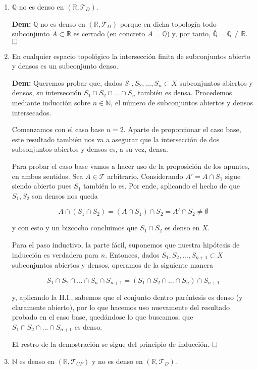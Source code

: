 \documentclass{article}
\begin{document}
\begin{enumerate}[label=(\textit{\roman*})]
    \item $\mathbb{Q}$ no es denso en $(\mathbb{R}, \mathcal{T}_D)$.

    \textbf{Dem:} $\mathbb{Q}$ no es denso en $(\mathbb{R}, \mathcal{T}_D)$ porque en dicha topología todo subconjunto $A \subset \mathbb{R}$ es cerrado (en concreto $A = \mathbb{Q}$) y, por tanto, $\overline{\mathbb{Q}} = \mathbb{Q} \neq \mathbb{R}$. $\hfill\square$

    \item En cualquier espacio topológico la intersección finita de subconjuntos abierto y densos  es un subconjunto denso.

    \textbf{Dem:} Queremos probar que, dados $S_1, S_2, ..., S_n \subset X$ subconjuntos abiertos y densos, su intersección $S_1 \cap S_2 \cap ... \cap S_n$ también es densa. Procedemos mediante inducción sobre $n \in \mathbb{N}$, el número de subconjuntos abiertos y densos intersecados.

    Comenzamos con el caso base $n = 2$. Aparte de proporcionar el caso base, este resultado también nos va a asegurar que la intersección de dos subsonjuntos abiertos y densos es, a su vez, densa.

    Para probar el caso base vamos a hacer uso de la proposición de los apuntes, en ambos sentidos. Sea $A \in \mathcal{T}$ arbitrario. Considerando $A' = A \cap S_1$ sigue siendo abierto pues $S_1$ también lo es. Por ende, aplicando el hecho de que $S_1, S_2$ son densos nos queda

    \[A \cap (S_1 \cap S_2) = (A \cap S_1) \cap S_2 = A' \cap S_2 \neq \emptyset\]

    y con esto y un bizcocho concluimos que $S_1 \cap S_2$ es denso en $X$.

    Para el paso inductivo, la parte fácil, suponemos que nuestra hipótesis de inducción es verdadera para $n$. Entonces, dados $S_1, S_2, ..., S_{n+1} \subset X$ subconjuntos abiertos y densos, operamos de la siguiente manera

    \[S_1 \cap S_2 \cap ... \cap S_n \cap S_{n+1} = (S_1 \cap S_2 \cap ... \cap S_n) \cap S_{n + 1}\]

    y, aplicando la H.I., sabemos que el conjunto dentro paréntesis es denso (y claramente abierto), por lo que hacemos uso nuevamente del resultado probado en el caso base, quedándose lo que buscamos, que $S_1 \cap S_2 \cap ... \cap S_{n+1}$ es denso.

    El restro de la demostración se sigue del principio de inducción. $\hfill\square$

    \item $\mathbb{N}$ es denso en $(\mathbb{R}, \mathcal{T}_{CF})$ y no es denso en $(\mathbb{R}, \mathcal{T}_{D})$.
\end{enumerate}
\end{document}
